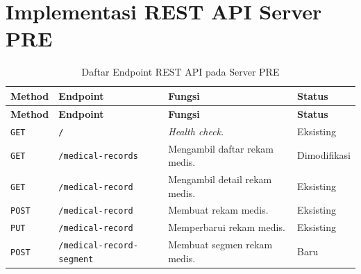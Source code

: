 \documentclass[bahasa, 12pt, a4paper, onecolumn, oneside, final]{report}
\begin{document}
\chapter{Implementasi REST API Server PRE}
\label{lampiran:implementasi-rest-api-pre}
{\small
	\begin{longtable}{|p{}|p{}|p{}|p{}|}
		\caption{Daftar Endpoint REST API pada Server PRE}
		\label{tab:daftar-endpoint-rest-api-pre}                                                                         \\
		\hline
		\textbf{Method} & \textbf{Endpoint}                                          & \textbf{Fungsi} & \textbf{Status} \\ \hline
		\endfirsthead

		\hline
		\textbf{Method} & \textbf{Endpoint}                                          & \textbf{Fungsi} & \textbf{Status} \\ \hline
		\endhead

		\texttt{GET}    & \texttt{/}
		                & \textit{Health check}.
		                & Eksisting                                                                                      \\ \hline

		\texttt{GET}    & \texttt{/medical-\allowbreak records}
		                & Mengambil daftar rekam medis.
		                & Dimodifikasi                                                                                   \\ \hline

		\texttt{GET}    & \texttt{/medical-\allowbreak record}
		                & Mengambil detail rekam medis.
		                & Eksisting                                                                                      \\ \hline

		\texttt{POST}   & \texttt{/medical-\allowbreak record}
		                & Membuat rekam medis.
		                & Eksisting                                                                                      \\ \hline

		\texttt{PUT}    & \texttt{/medical-\allowbreak record}
		                & Memperbarui rekam medis.
		                & Eksisting                                                                                      \\ \hline

		\texttt{POST}   & \texttt{/medical-\allowbreak record-\allowbreak segment}
		                & Membuat segmen rekam medis.
		                & Baru                                                                                           \\ \hline


\end{longtable}}
\end{document}
